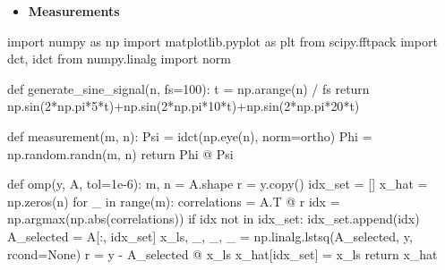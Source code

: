 \documentclass[
  letterpaper,
  DIV=11,
  numbers=noendperiod]{scrartcl}
\newenvironment{Shaded}{\begin{snugshade}}{\end{snugshade}}
\newcommand{\BuiltInTok}[1]{\textcolor[rgb]{0.40,0.85,0.94}{#1}}
\newcommand{\ControlFlowTok}[1]{\textcolor[rgb]{0.98,0.15,0.45}{#1}}
\newcommand{\DecValTok}[1]{\textcolor[rgb]{0.68,0.51,1.00}{#1}}
\newcommand{\FloatTok}[1]{\textcolor[rgb]{0.68,0.51,1.00}{#1}}
\newcommand{\ImportTok}[1]{\textcolor[rgb]{0.98,0.15,0.45}{#1}}
\newcommand{\KeywordTok}[1]{\textcolor[rgb]{0.98,0.15,0.45}{#1}}
\newcommand{\NormalTok}[1]{\textcolor[rgb]{0.97,0.97,0.95}{#1}}
\newcommand{\OperatorTok}[1]{\textcolor[rgb]{0.97,0.97,0.95}{#1}}
\newcommand{\StringTok}[1]{\textcolor[rgb]{0.90,0.86,0.45}{#1}}
\newcommand{\VariableTok}[1]{\textcolor[rgb]{0.97,0.97,0.95}{#1}}
\providecommand{\tightlist}{%
  \setlength{\itemsep}{0pt}\setlength{\parskip}{0pt}}
\begin{document}
\begin{itemize}
\tightlist
\item
  \textbf{Measurements}
\end{itemize}

\begin{Shaded}
\begin{Highlighting}[]
\ImportTok{import}\NormalTok{ numpy }\ImportTok{as}\NormalTok{ np}
\ImportTok{import}\NormalTok{ matplotlib.pyplot }\ImportTok{as}\NormalTok{ plt}
\ImportTok{from}\NormalTok{ scipy.fftpack }\ImportTok{import}\NormalTok{ dct, idct}
\ImportTok{from}\NormalTok{ numpy.linalg }\ImportTok{import}\NormalTok{ norm}

\KeywordTok{def}\NormalTok{ generate\_sine\_signal(n, fs}\OperatorTok{=}\DecValTok{100}\NormalTok{):}
\NormalTok{    t }\OperatorTok{=}\NormalTok{ np.arange(n) }\OperatorTok{/}\NormalTok{ fs}
    \ControlFlowTok{return}\NormalTok{ np.sin(}\DecValTok{2}\OperatorTok{*}\NormalTok{np.pi}\OperatorTok{*}\DecValTok{5}\OperatorTok{*}\NormalTok{t)}\OperatorTok{+}\NormalTok{np.sin(}\DecValTok{2}\OperatorTok{*}\NormalTok{np.pi}\OperatorTok{*}\DecValTok{10}\OperatorTok{*}\NormalTok{t)}\OperatorTok{+}\NormalTok{np.sin(}\DecValTok{2}\OperatorTok{*}\NormalTok{np.pi}\OperatorTok{*}\DecValTok{20}\OperatorTok{*}\NormalTok{t)}

\KeywordTok{def}\NormalTok{ measurement(m, n):}
\NormalTok{    Psi }\OperatorTok{=}\NormalTok{ idct(np.eye(n), norm}\OperatorTok{=}\StringTok{\textquotesingle{}ortho\textquotesingle{}}\NormalTok{)}
\NormalTok{    Phi }\OperatorTok{=}\NormalTok{ np.random.randn(m, n)}
    \ControlFlowTok{return}\NormalTok{ Phi }\OperatorTok{@}\NormalTok{ Psi}

\KeywordTok{def}\NormalTok{ omp(y, A, tol}\OperatorTok{=}\FloatTok{1e{-}6}\NormalTok{):}
\NormalTok{    m, n }\OperatorTok{=}\NormalTok{ A.shape}
\NormalTok{    r }\OperatorTok{=}\NormalTok{ y.copy()}
\NormalTok{    idx\_set }\OperatorTok{=}\NormalTok{ []}
\NormalTok{    x\_hat }\OperatorTok{=}\NormalTok{ np.zeros(n)}
    \ControlFlowTok{for}\NormalTok{ \_ }\KeywordTok{in} \BuiltInTok{range}\NormalTok{(m):}
\NormalTok{        correlations }\OperatorTok{=}\NormalTok{ A.T }\OperatorTok{@}\NormalTok{ r}
\NormalTok{        idx }\OperatorTok{=}\NormalTok{ np.argmax(np.}\BuiltInTok{abs}\NormalTok{(correlations))}
        \ControlFlowTok{if}\NormalTok{ idx }\KeywordTok{not} \KeywordTok{in}\NormalTok{ idx\_set:}
\NormalTok{            idx\_set.append(idx)}
\NormalTok{        A\_selected }\OperatorTok{=}\NormalTok{ A[:, idx\_set]}
\NormalTok{        x\_ls, \_, \_, \_ }\OperatorTok{=}\NormalTok{ np.linalg.lstsq(A\_selected, y, rcond}\OperatorTok{=}\VariableTok{None}\NormalTok{)}
\NormalTok{        r }\OperatorTok{=}\NormalTok{ y }\OperatorTok{{-}}\NormalTok{ A\_selected }\OperatorTok{@}\NormalTok{ x\_ls}
\NormalTok{    x\_hat[idx\_set] }\OperatorTok{=}\NormalTok{ x\_ls}
    \ControlFlowTok{return}\NormalTok{ x\_hat}


\end{Highlighting}
\end{Shaded}
\end{document}
